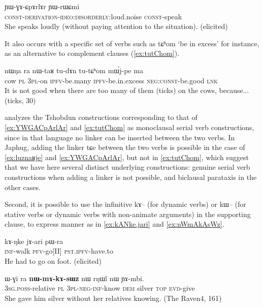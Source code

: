 \documentclass[oldfontcommands,oneside,a4paper,11pt]{article}
\newcommand{\ipa}[1]{{\phon \mbox{#1}}} %
\begin{document}
\begin{exe}
\ex \label{ex:YWGACpArlAr}
\gll
\ipa{ɲɯ-ɣɤ-ɕpɤrlɤr} 	\ipa{ɲɯ-rɯɕmi} \\
\textsc{const-derivation-ideo:disorderly:}loud.noise \textsc{const}-speak\\
\glt She speaks loudly (without paying attention to the situation). (elicited)
\end{exe}

It also occurs with a specific set of verbs such as \ipa{tɕʰom} `be in excess' for instance, as an alternative to complement clauses (\ref{ex:tutChom}).

\begin{exe}
\ex \label{ex:tutChom}
\gll
\ipa{nɯŋa} 	\ipa{ra} 	\ipa{nɯ-taʁ} 	\ipa{tu-dɤn} 	\ipa{tu-tɕʰom} 	\ipa{mɯ́j-pe} 	\ipa{ma} \\
cow \textsc{pl} \textsc{3pl}-on \textsc{ipfv}-be.many \textsc{ipfv}-be.in.excess \textsc{neg:const}-be.good \textsc{lnk} \\
\glt It is not good when there are too many of them (ticks) on the cows, because... (ticks, 30)
\end{exe}

 \citet{sun12complementation} analyzes the  Tshobdun constructions     corresponding to that of \ref{ex:YWGACpArlAr} and \ref{ex:tutChom} as monoclausal serial verb constructions, since in that language no linker can be inserted between the two verbs. In Japhug,   adding the linker \ipa{tɕe} between the two verbs is possible in the case of \ref{ex:luznaʁje} and \ref{ex:YWGACpArlAr}, but not in \ref{ex:tutChom}, which suggest that we have here several distinct underlying constructions: genuine serial verb constructions when adding a linker is not possible, and biclausal parataxis in the other cases. %


Second, it is possible to use the infinitive \ipa{kɤ--} (for dynamic verbs) or \ipa{kɯ--} (for stative verbs or dynamic verbs with non-animate arguments) in the supporting clause, to express manner as in \ref{ex:kANke.jari} and \ref{ex:nWmAkAsWz}.

\begin{exe}
\ex \label{ex:kANke.jari}
\gll
\ipa{kɤ-ŋke} 	\ipa{jɤ-ari} 	\ipa{pɯ-ra} \\
\textsc{inf}-walk \textsc{pfv}-go[II] \textsc{pst.ipfv}-have.to \\
\glt He had to go on foot. (elicited)
\end{exe}

 
\begin{exe}
\ex \label{ex:nWmAkAsWz}
\gll
\ipa{ɯ-ɣi}   	\ipa{ra}   	\ipa{\textbf{nɯ-mɤ-kɤ-sɯz}}   	\ipa{nɯ}   	\ipa{rŋɯl}   	\ipa{nɯ}   	\ipa{ɲɤ-mbi.}   \\
\textsc{3sg.poss}-relative \textsc{pl} \textsc{3pl-neg-inf}-know \textsc{dem} silver \textsc{top} \textsc{evd}-give \\
\glt  She gave him silver without her relatives knowing. (The Raven4, 161)
\end{exe}
\end{document}
